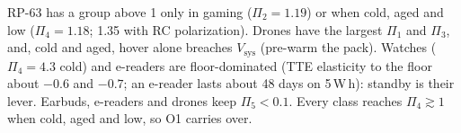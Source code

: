 RP-63 has a group above 1 only in gaming ($\Pi_2=1.19$) or when cold, aged and low ($\Pi_4=1.18$; 1.35 with RC
polarization). Drones have the largest $\Pi_1$ and $\Pi_3$, and, cold and aged, hover alone breaches
$V_{\mathrm{sys}}$ (pre-warm the pack). Watches ($\Pi_4=4.3$ cold) and e-readers are floor-dominated (TTE elasticity
to the floor about $-0.6$ and $-0.7$; an e-reader lasts about 48 days on 5\,W\,h): standby is their lever.
Earbuds, e-readers and drones keep $\Pi_5<0.1$. Every class reaches $\Pi_4\gtrsim1$ when cold, aged
and low, so O1 carries over.
